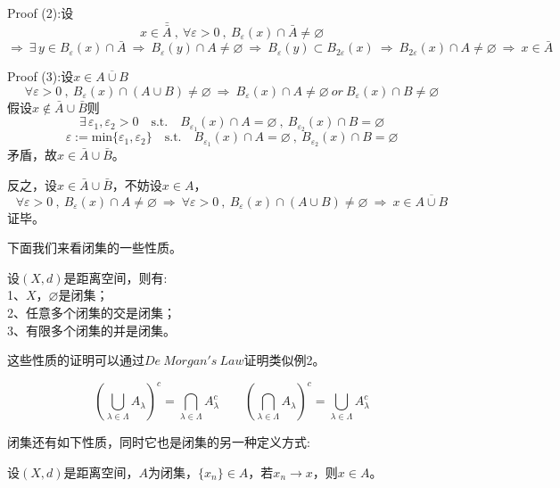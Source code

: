 Proof (2):设
\[x \in \bar{\bar{A}} \ , \ \forall \varepsilon>0 \ , \ B_{\varepsilon}(x) \cap \bar{A} \neq \varnothing\]
\[\Rightarrow \ \exists \, y \in B_{\varepsilon}(x) \cap \bar{A} \ \Rightarrow \ B_{\varepsilon}(y) \cap A \neq \varnothing \ \Rightarrow \ B_{\varepsilon}(y) \subset B_{2\varepsilon}(x) \ \Rightarrow \ B_{2\varepsilon}(x) \cap A \neq \varnothing \ \Rightarrow \ x \in \bar{A}\]

Proof (3):设$x \in \overline{A \cup B}$
\[\forall \varepsilon>0 \ , \ B_{\varepsilon}(x) \cap (A \cup B) \neq \varnothing \ \Rightarrow \ B_{\varepsilon}(x) \cap A \neq \varnothing \ or \ B_{\varepsilon}(x) \cap B \neq \varnothing\]
假设$x \notin \bar{A} \cup \bar{B}$则
\[\exists \, \varepsilon_1,\varepsilon_2>0 \quad \text{s.t.} \quad B_{\varepsilon_1}(x) \cap A=\varnothing \ , \ B_{\varepsilon_2}(x) \cap B=\varnothing\]
\[\varepsilon:=\text{min}\{\varepsilon_1,\varepsilon_2\} \quad \text{s.t.} \quad B_{\varepsilon_1}(x) \cap A=\varnothing \ , \ B_{\varepsilon_2}(x) \cap B=\varnothing\]
矛盾，故$x \in \bar{A} \cup \bar{B}$。

反之，设$x \in \bar{A} \cup \bar{B}$，不妨设$x \in A$，
\[\forall \varepsilon>0 \ , \ B_{\varepsilon}(x) \cap A \neq \varnothing \ \Rightarrow \ \forall \varepsilon>0 \ , \ B_{\varepsilon}(x) \cap (A \cup B) \neq \varnothing \ \Rightarrow  \ x \in \overline{A \cup B}\]
证毕。

下面我们来看闭集的一些性质。
\begin{theorem}
    设$(X,d)$是距离空间，则有:\\
    1、$X$，$\varnothing$是闭集；\\
    2、任意多个闭集的交是闭集；\\
    3、有限多个闭集的并是闭集。
\end{theorem}

这些性质的证明可以通过$De \ Morgan's \ Law$证明类似例2。
\begin{theorem}
\[\left(\bigcup\limits_{\lambda \in \Lambda}A_{\lambda}\right)^c=\bigcap\limits_{\lambda \in \Lambda}A_{\lambda}^c \qquad \left(\bigcap\limits_{\lambda \in \Lambda}A_{\lambda}\right)^c=\bigcup\limits_{\lambda \in \Lambda}A_{\lambda}^c\]
\end{theorem}

闭集还有如下性质，同时它也是闭集的另一种定义方式:
\begin{theorem}
    设$(X,d)$是距离空间，$A$为闭集，$\{x_n\} \in A$，若$x_n \rightarrow x$，则$x \in A$。
\end{theorem}


